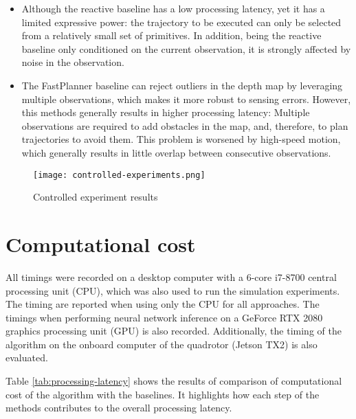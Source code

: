\begin{itemize}
	\item Although the reactive\cite{reactive_method} baseline has a low processing latency, yet it has a limited expressive power: the trajectory to be executed can only be selected from a relatively small set of primitives. In addition, being the reactive\cite{reactive_method} baseline only conditioned on the current observation, it is strongly affected by noise in the observation.
	\item The FastPlanner\cite{fastPlanner} baseline can reject outliers in the depth map by leveraging multiple observations, which makes it more robust to sensing errors. However, this methods generally results in higher processing latency: Multiple observations are required to add obstacles in the map, and, therefore, to plan trajectories to avoid them. This problem is worsened by high-speed motion, which generally results in little overlap between consecutive observations.
\end{itemize}

\begin{figure}[!h]
	\texttt{[image: controlled-experiments.png]}
	\caption{Controlled experiment results}
	\label{fig:stimulated_results}
\end{figure}


\section{Computational cost}
All timings were recorded on a desktop computer with a 6-core i7-8700 central processing unit (CPU), which was also used to run the simulation experiments. The timing are reported when using only the CPU for all approaches. The timings when performing neural network inference on a GeForce RTX 2080 graphics processing unit (GPU) is also recorded. Additionally, the timing of the algorithm on the onboard computer of the quadrotor (Jetson TX2) is also evaluated.

Table \ref{tab:processing-latency} shows the results of comparison of computational cost of the algorithm with the baselines. It highlights how each step of the methods contributes to the overall processing latency. 

